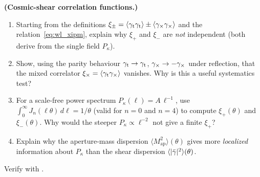 \begin{exercise}
\label{ex:wl_cosmic}
\textbf{(Cosmic-shear correlation functions.)}
\begin{enumerate}[label=(\alph*)]
    \item Starting from the definitions
          $\xi_\pm = \langle\gamma_{\mathrm t}\gamma_{\mathrm t}\rangle
          \pm \langle\gamma_\times\gamma_\times\rangle$ and the
          relation~\eqref{eq:wl_xipm}, explain why $\xi_+$ and $\xi_-$
          are \textit{not} independent (both derive from the single
          field $P_\kappa$).
    \item Show, using the parity behaviour $\gamma_{\mathrm t} \to
          \gamma_{\mathrm t}$, $\gamma_\times \to -\gamma_\times$ under
          reflection, that the mixed correlator
          $\xi_\times = \langle\gamma_{\mathrm t}\gamma_\times\rangle$
          vanishes.  Why is this a useful systematics test?
    \item For a scale-free power spectrum $P_\kappa(\ell) = A\,\ell^{-1}$,
          use $\int_0^\infty J_n(\ell\theta)\,d\ell = 1/\theta$ (valid for
          $n = 0$ and $n = 4$) to compute $\xi_+(\theta)$ and
          $\xi_-(\theta)$.  Why would the steeper $P_\kappa \propto \ell^{-2}$
          not give a finite $\xi_+$?
    \item Explain why the aperture-mass dispersion
          $\langle M_{\mathrm{ap}}^2\rangle(\theta)$ gives more
          \textit{localized} information about $P_\kappa$ than the shear
          dispersion $\langle|\bar{\gamma}|^2\rangle(\theta)$.
\end{enumerate}
Verify with
.
\end{exercise}
